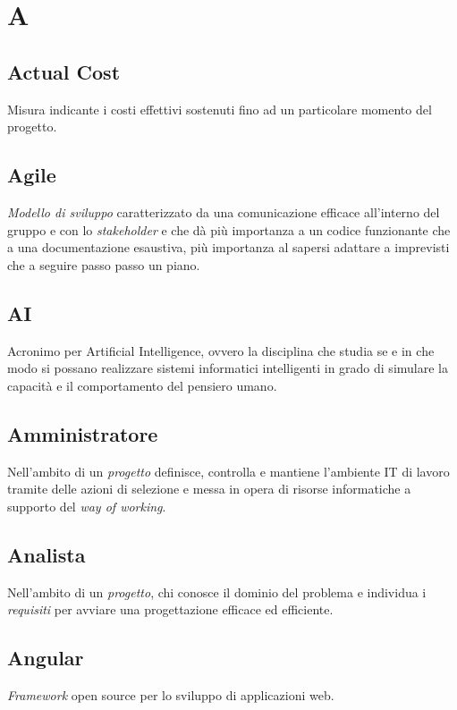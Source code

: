 \chapter{A}

\section{Actual Cost}
Misura indicante i costi effettivi sostenuti fino ad un particolare momento del progetto.

\section{Agile}
\emph{Modello di sviluppo} caratterizzato da una comunicazione efficace all'interno del gruppo e con lo \emph{stakeholder} e che dà più importanza a un codice funzionante che a una documentazione esaustiva, più importanza al sapersi adattare a imprevisti che a seguire passo passo un piano.

\section{AI}
Acronimo per Artificial Intelligence, ovvero la disciplina che studia se e in che modo si possano realizzare sistemi informatici intelligenti in grado di simulare la capacità e il comportamento del pensiero umano.

\section{Amministratore}
Nell'ambito di un \emph{progetto} definisce, controlla e mantiene l'ambiente IT di lavoro tramite delle azioni di selezione e messa in opera di risorse informatiche a supporto del \emph{way of working}. 

\section{Analista}
Nell'ambito di un \emph{progetto}, chi conosce il dominio del problema e individua i \emph{requisiti} per avviare una progettazione efficace ed efficiente.

\section{Angular}
\emph{Framework} open source per lo sviluppo di applicazioni web.

